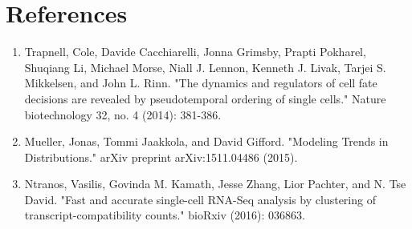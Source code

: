 \documentclass[11pt,onecolumn]{article}
\begin{document}
\section{References}
\begin{enumerate}
	\item Trapnell, Cole, Davide Cacchiarelli, Jonna Grimsby, Prapti Pokharel, Shuqiang Li, Michael Morse, Niall J. Lennon, Kenneth J. Livak, Tarjei S. Mikkelsen, and John L. Rinn. "The dynamics and regulators of cell fate decisions are revealed by pseudotemporal ordering of single cells." Nature biotechnology 32, no. 4 (2014): 381-386.
	\item Mueller, Jonas, Tommi Jaakkola, and David Gifford. "Modeling Trends in Distributions." arXiv preprint arXiv:1511.04486 (2015).
	\item Ntranos, Vasilis, Govinda M. Kamath, Jesse Zhang, Lior Pachter, and N. Tse David. "Fast and accurate single-cell RNA-Seq analysis by clustering of transcript-compatibility counts." bioRxiv (2016): 036863.
\end{enumerate}
\end{document}
